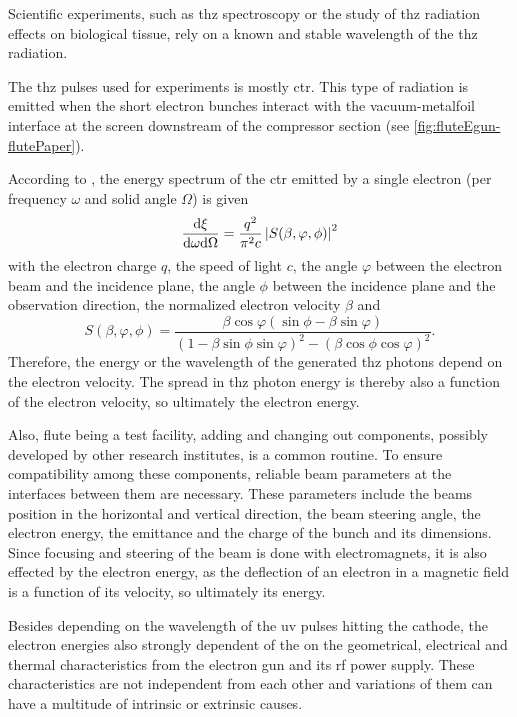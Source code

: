 Scientific experiments, such as \gls{thz} spectroscopy or the study of \gls{thz} radiation effects on biological tissue, rely on a known and stable wavelength of the \gls{thz} radiation. 

The \gls{thz} pulses used for experiments is mostly \gls{ctr}. This type of radiation is emitted when the short electron bunches interact with the vacuum-metalfoil interface at the screen downstream of the compressor section (see \autoref{fig:fluteEgun-flutePaper}). \cite{Yan:IPAC2016-WEPOY037,Thongbai2007}

According to \cite{ding2019coherent}, the energy spectrum of the \gls{ctr} emitted by a single electron (per frequency $\omega$ and solid angle $\Omega$) is given
\begin{equation}
\frac{\text{d}{\xi}}{\text{d}{\omega}\text{d}{\Omega}} = \frac{q^2}{\pi^2 c} \left|S(\beta,\varphi,\phi)\right|^2
\end{equation}
with the electron charge $q$, the speed of light $c$, the angle $\varphi$ between the electron beam and the incidence plane, the angle $\phi$ between the incidence plane and the observation direction, the normalized electron velocity $\beta$ and
\begin{equation}
S(\beta,\varphi,\phi) = \frac{\beta \cos \varphi (\sin \phi -\beta \sin \varphi)}{(1-\beta \sin \phi \sin \varphi)^2-(\beta \cos \phi \cos \varphi)^2}.
\end{equation}
Therefore, the energy or the wavelength of the generated \gls{thz} photons depend on the electron velocity. The spread in \gls{thz} photon energy is thereby also a function of the electron velocity, so ultimately the electron energy.

Also, \gls{flute} being a test facility, adding and changing out components, possibly developed by other research institutes, is a common routine. To ensure compatibility among these components, reliable beam parameters at the interfaces between them are necessary. These parameters include the beams position in the horizontal and vertical direction, the beam steering angle, the electron energy, the emittance and the charge of the bunch and its dimensions. Since focusing and steering of the beam is done with electromagnets, it is also effected by the electron energy, as the deflection of an electron in a magnetic field is a function of its velocity, so ultimately its energy.

Besides depending on the wavelength of the \gls{uv} pulses hitting the cathode, the electron energies also strongly dependent of the  on the geometrical, electrical and thermal characteristics from the electron gun and its \gls{rf} power supply. These characteristics are not independent from each other and variations of them can have a multitude of intrinsic or extrinsic causes.

